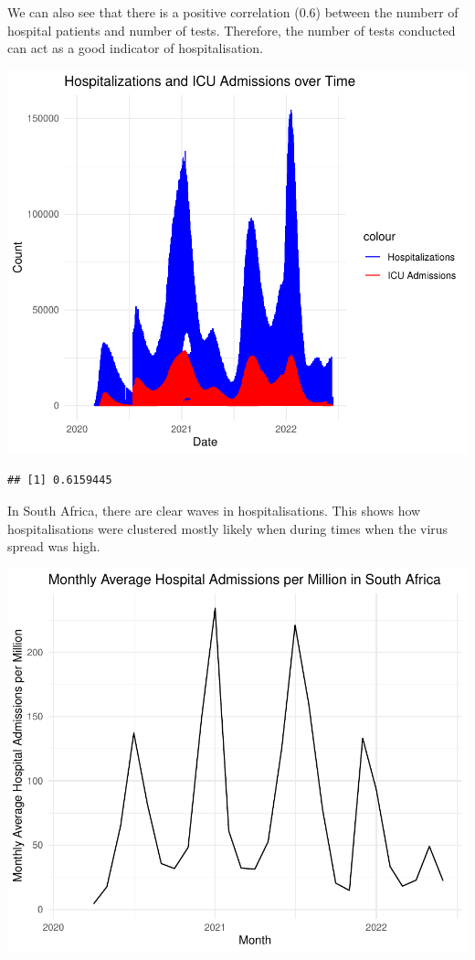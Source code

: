 \documentclass[11pt,preprint, authoryear]{elsarticle}
\numberwithin{equation}{section}
\numberwithin{figure}{section}
\numberwithin{table}{section}
\begin{document}
We can also see that there is a positive correlation (0.6) between the
numberr of hospital patients and number of tests. Therefore, the number
of tests conducted can act as a good indicator of hospitalisation.

\includegraphics{Q1_files/figure-latex/unnamed-chunk-2-1.pdf}

\begin{verbatim}
## [1] 0.6159445
\end{verbatim}

In South Africa, there are clear waves in hospitalisations. This shows
how hospitalisations were clustered mostly likely when during times when
the virus spread was high.

\includegraphics{Q1_files/figure-latex/unnamed-chunk-3-1.pdf}
\end{document}
